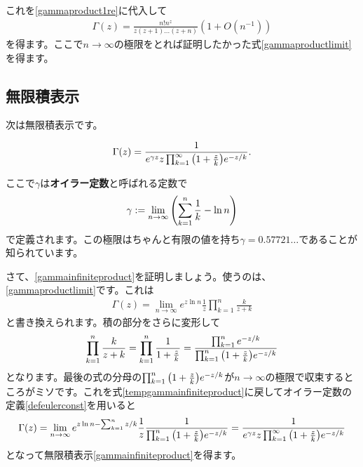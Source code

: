 \documentclass[report,paper=a4, fontsize=12pt, line_length=16cm, number_of_lines=33,dvipdfmx]{jlreq}
\newenvironment{important}{\begin{tcolorbox}[
  colback = white,
  colframe = red!35,
  boxrule = 2mm,
  fonttitle = \bfseries,
  after = \noindent] }{\end{tcolorbox}}
\numberwithin{equation}{section}
\newcommand{\strong}[1]{\textsf{\bfseries #1}}
\begin{document}
これを\eqref{gammaproduct1re}に代入して
\begin{align}
  \Gamma(z)=\frac{n!n^z}{z(z+1)\dots (z+n)} (1+O(n^{-1}))
\end{align}
を得ます。ここで$n\to\infty$の極限をとれば証明したかった式\eqref{gammaproductlimit}を得ます。


\subsection{無限積表示}
次は無限積表示です。
\begin{important}
  \begin{align}
    \Gamma(z)=\frac{1}{e^{\gamma z}z \prod_{k=1}^{\infty}\qty(1+\frac{z}{k})e^{-z/k} }.  \label{gammainfiniteproduct}  
  \end{align}
\end{important}
ここで$\gamma$は\strong{オイラー定数}と呼ばれる定数で
\begin{align}
  \gamma:=\lim_{n\to\infty}\qty(\sum_{k=1}^{n}\frac{1}{k}-\ln n)\label{defeulerconst}
\end{align}
で定義されます。この極限はちゃんと有限の値を持ち$\gamma=0.57721\dots$であることが知られています。

さて、\eqref{gammainfiniteproduct}を証明しましょう。使うのは、\eqref{gammaproductlimit}です。これは
\begin{align}
  \Gamma(z)=\lim_{n\to\infty}e^{z\ln n}\frac{1}{z}
  \prod_{k=1}^{n}\frac{k}{z+k}\label{tempgammainfiniteproduct}
\end{align}
と書き換えられます。積の部分をさらに変形して
\begin{align}
  \prod_{k=1}^{n}\frac{k}{z+k}=\prod_{k=1}^{n}\frac{1}{1+\frac{z}{k}}=\frac{\prod_{k=1}^{n}e^{-z/k}}{\prod_{k=1}^{n}\qty(1+\frac{z}{k})e^{-z/k}}
\end{align}
となります。最後の式の分母の$\prod_{k=1}^{n}\qty(1+\frac{z}{k})e^{-z/k}$が$n\to\infty$の極限で収束するところがミソです。これを式\eqref{tempgammainfiniteproduct}に戻してオイラー定数の定義\eqref{defeulerconst}を用いると
\begin{align}
  \Gamma(z)=\lim_{n\to\infty}e^{z\ln n-\sum_{k=1}^n z/k}\frac{1}{z}
  \frac{1}{\prod_{k=1}^{n}\qty(1+\frac{z}{k})e^{-z/k}}
  =\frac{1}{e^{\gamma z}z \prod_{k=1}^{\infty}\qty(1+\frac{z}{k})e^{-z/k} }
\end{align}
となって無限積表示\eqref{gammainfiniteproduct}を得ます。
\end{document}
